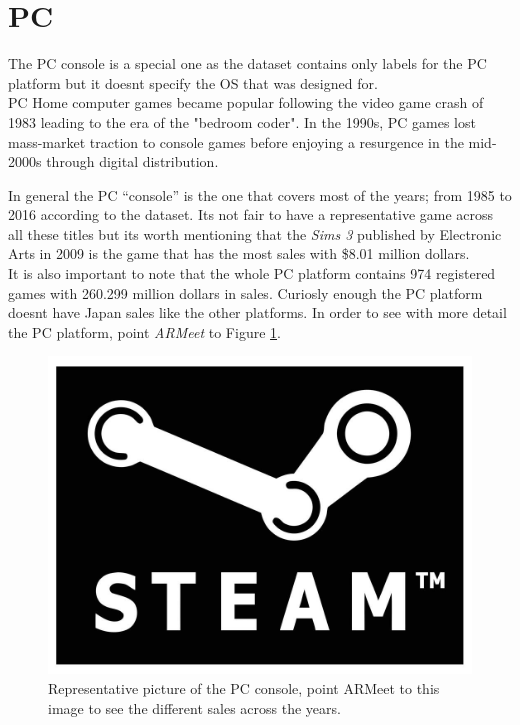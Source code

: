 \section{PC}
The PC console is a special one as the dataset contains only labels for the
PC platform but it doesnt specify the OS that was designed for.\\
PC Home computer games became popular following the video game crash of 1983 leading
to the era of the "bedroom coder". In the 1990s, PC games lost mass-market
traction to console games before enjoying a resurgence in the mid-2000s
through digital distribution\cite{PC}.

In general the PC ``console'' is the one that covers most of the years; from
1985 to 2016 according to the dataset. Its not fair to have a representative
game across all these titles but its worth mentioning that the \textit{Sims
  3} published by Electronic Arts in 2009 is the game that has the most sales
with \$8.01 million dollars.\\
It is also important to note that the whole PC platform contains 974
registered games with 260.299 million dollars in sales. Curiosly enough the
PC platform doesnt have Japan sales like the other platforms. In order to see with
more detail the PC platform, point \textit{ARMeet} to Figure \ref{fig:PCImage}.

\begin{figure}[h!]
  \centering
  \centerline{\includegraphics[scale=0.25]{images/PCMainTarget.png}}
  \caption{Representative picture of the PC console, point ARMeet to this image to
    see the different sales across the years.}
  \label{fig:PCImage}
\end{figure}

